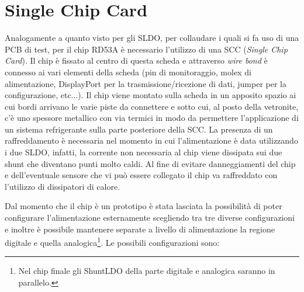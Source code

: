 \section{Single Chip Card}
Analogamente a quanto visto per gli SLDO, per  collaudare i quali si fa uso di una PCB di test, per il chip RD53A è necessario l'utilizzo di una SCC (\textit{Single Chip Card}). 
Il chip è fissato al centro di questa scheda e attraverso \textit{wire bond} è connesso ai vari elementi della scheda (pin di monitoraggio, molex di alimentazione, DisplayPort per la trasmissione/ricezione di dati, jumper per la configurazione, etc...). 
Il chip viene montato sulla scheda in un apposito spazio ai cui bordi arrivano le varie piste da connettere e sotto cui, al posto della vetronite, c'è uno spessore metallico con via termici in modo da permettere l'applicazione di un sistema refrigerante sulla parte posteriore della SCC. 
La presenza di un raffreddamento è necessaria nel momento in cui l'alimentazione è data utilizzando i due SLDO, infatti, la corrente non necessaria al chip viene dissipata sui due shunt che diventano punti molto caldi. 
Al fine di evitare danneggiamenti del chip e dell'eventuale sensore che vi può essere collegato il chip va raffreddato con l'utilizzo di dissipatori di calore. 

Dal momento che il chip è un prototipo è stata lasciata la possibilità di poter configurare l'alimentazione esternamente scegliendo tra tre diverse configurazioni e inoltre è possibile mantenere separate a livello di alimentazione la regione digitale e quella analogica\footnote{Nel chip finale gli ShuntLDO della parte digitale e analogica saranno in parallelo.}.
Le possibili configurazioni sono:

